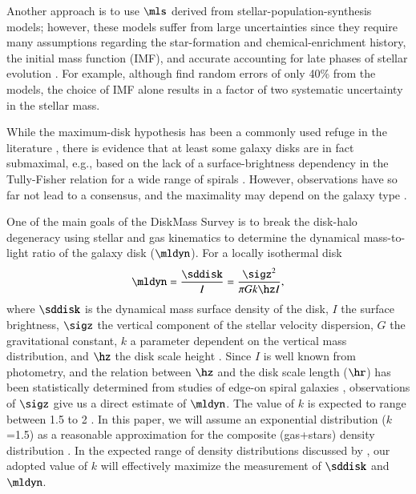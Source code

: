 \documentclass[traditabstract]{aa} %
\begin{document}
Another approach is to use $\mls$ derived from stellar-population-synthesis models;
however, these models suffer from large uncertainties since they require many assumptions
regarding the star-formation and chemical-enrichment history, the initial mass function
(IMF), and accurate accounting for late phases of stellar evolution \citep{maraston2005,
conroy2009}. For example, although \cite{kauffmann2003} find random errors of only 40\%
from the models, the choice of IMF alone results in a factor of two systematic
uncertainty in the stellar mass.

While the maximum-disk hypothesis has been a commonly used refuge in the literature
\citep[e.g.,][]{albada1985,kent1986,BroeilsCourteau1997}, there is evidence that at least
some galaxy disks are in fact submaximal, e.g., based on the lack of a surface-brightness
dependency in the Tully-Fisher relation \citep[TF;][]{tullyfisher1977} for a wide range
of spirals \citep{zwaan1995,courteau1999,courteau2003}. However, observations have
so far not lead to a consensus, and the maximality may depend on the galaxy type
\citep{bottema1993, weiner2001, kranz2003, kregel2005, byrd2006, herrmann2009, dutton2011,
dutton2013,barnabe2012}.

One of the main goals of the DiskMass Survey \citep[DMS;][hereafter 
]{bershady2010a} is to break the disk-halo degeneracy using
stellar and gas kinematics to determine the dynamical mass-to-light ratio of the
galaxy disk ($\mldyn$). For a locally isothermal disk 
%
\begin{equation}
%
\mldyn = \frac{\sddisk}{I} = \frac{\sigz^2}{\pi G k \hz I} ,
%
\label{eq:mldyn}
%
\end{equation}
%
where $\sddisk$ is the dynamical mass surface density of the disk, $I$ the surface
brightness, $\sigz$ the vertical component of the stellar velocity dispersion, $G$ the 
gravitational constant, $k$ a parameter dependent on the vertical mass distribution, and 
$\hz$ the disk scale height \citep{kruit1981,bahcall1984}. Since $I$ is well known from 
photometry, and the relation between $\hz$ and the disk scale length ($\hr$) has
been statistically determined from studies of edge-on spiral galaxies \citep[e.g.,][see
also the compilation in Fig.~1 of \citealt{bershady2010b}, hereafter 
]{GrijsKruit1996,kregel2002}, observations of $\sigz$ give us a
direct estimate of $\mldyn$. The value of $k$ is expected to range between 1.5 to 2
\citep[exponential to isothermal distribution;][]{kruit1988}. In this paper, we will
assume an exponential distribution ($k$=1.5) as a reasonable approximation for the
composite (gas+stars) density distribution . In the expected
range of density distributions discussed by \cite{kruit1988}, our adopted value of $k$
will effectively maximize the measurement of $\sddisk$ and $\mldyn$.
\end{document}
